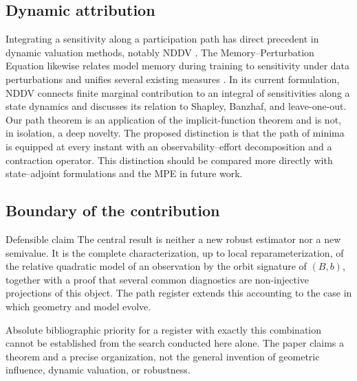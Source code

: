 \documentclass[10pt,a4paper]{article}
\begin{document}
\subsection{Dynamic attribution}
Integrating a sensitivity along a participation path has direct precedent in dynamic valuation methods, notably NDDV \citep{liang2024nddv}. The Memory--Perturbation Equation likewise relates model memory during training to sensitivity under data perturbations and unifies several existing measures \citep{nickl2023mpe}. In its current formulation, NDDV connects finite marginal contribution to an integral of sensitivities along a state dynamics and discusses its relation to Shapley, Banzhaf, and leave-one-out. Our path theorem is an application of the implicit-function theorem and is not, in isolation, a deep novelty. The proposed distinction is that the path of minima is equipped at every instant with an observability--effort decomposition and a contraction operator. This distinction should be compared more directly with state--adjoint formulations and the MPE in future work.

\subsection{Boundary of the contribution}
\begin{statementbox}{Defensible claim}
The central result is neither a new robust estimator nor a new semivalue. It is the complete characterization, up to local reparameterization, of the relative quadratic model of an observation by the orbit signature of $(B,b)$, together with a proof that several common diagnostics are non-injective projections of this object. The path register extends this accounting to the case in which geometry and model evolve.
\end{statementbox}
Absolute bibliographic priority for a register with exactly this combination cannot be established from the search conducted here alone. The paper claims a theorem and a precise organization, not the general invention of geometric influence, dynamic valuation, or robustness.

\end{document}
